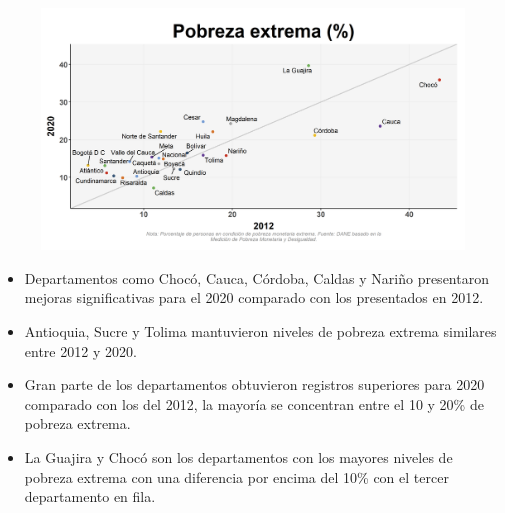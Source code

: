     \begin{figure}[H]
        \caption[Pobreza extrema por departamentos - 2012 VS 2020 ]{\label{pobreza_extrema_dptos_vs} }
        \begin{center}
        \includegraphics[width=\textwidth,keepaspectratio]{img/var_258_scatter_time.png}
        \end{center}
    \end{figure}
            \begin{itemize}
                    \item Departamentos como Chocó, Cauca, Córdoba, Caldas y Nariño presentaron mejoras significativas para el 2020 comparado con los presentados en 2012.
                    \item Antioquia, Sucre y Tolima mantuvieron niveles de pobreza extrema similares entre 2012 y 2020.
                    \item Gran parte de los departamentos obtuvieron registros superiores para 2020 comparado con los del 2012, la mayoría se concentran entre el 10 y 20\% de pobreza extrema.
                    \item La Guajira y Chocó son los departamentos con los mayores niveles de pobreza extrema con una diferencia por encima del 10\% con el tercer departamento en fila.
                    \end{itemize}

